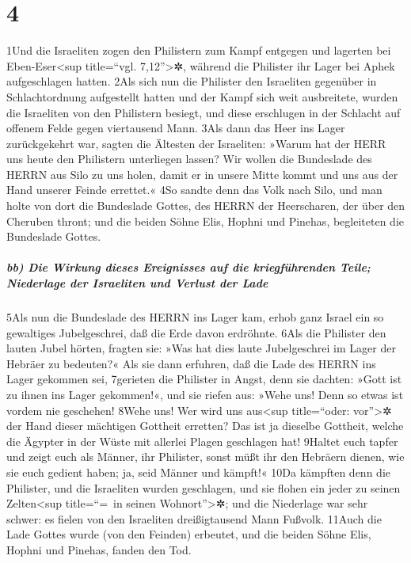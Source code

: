 \hypertarget{section-3}{%
\section{4}\label{section-3}}

1Und die Israeliten zogen den Philistern zum Kampf entgegen und lagerten
bei Eben-Eser\textless sup title=``vgl. 7,12''\textgreater✲, während die
Philister ihr Lager bei Aphek aufgeschlagen hatten. 2Als sich nun die
Philister den Israeliten gegenüber in Schlachtordnung aufgestellt hatten
und der Kampf sich weit ausbreitete, wurden die Israeliten von den
Philistern besiegt, und diese erschlugen in der Schlacht auf offenem
Felde gegen viertausend Mann. 3Als dann das Heer ins Lager zurückgekehrt
war, sagten die Ältesten der Israeliten: »Warum hat der HERR uns heute
den Philistern unterliegen lassen? Wir wollen die Bundeslade des HERRN
aus Silo zu uns holen, damit er in unsere Mitte kommt und uns aus der
Hand unserer Feinde errettet.« 4So sandte denn das Volk nach Silo, und
man holte von dort die Bundeslade Gottes, des HERRN der Heerscharen, der
über den Cheruben thront; und die beiden Söhne Elis, Hophni und Pinehas,
begleiteten die Bundeslade Gottes.

\hypertarget{bb-die-wirkung-dieses-ereignisses-auf-die-kriegfuxfchrenden-teile-niederlage-der-israeliten-und-verlust-der-lade}{%
\subparagraph{bb) Die Wirkung dieses Ereignisses auf die kriegführenden
Teile; Niederlage der Israeliten und Verlust der
Lade}\label{bb-die-wirkung-dieses-ereignisses-auf-die-kriegfuxfchrenden-teile-niederlage-der-israeliten-und-verlust-der-lade}}

5Als nun die Bundeslade des HERRN ins Lager kam, erhob ganz Israel ein
so gewaltiges Jubelgeschrei, daß die Erde davon erdröhnte. 6Als die
Philister den lauten Jubel hörten, fragten sie: »Was hat dies laute
Jubelgeschrei im Lager der Hebräer zu bedeuten?« Als sie dann erfuhren,
daß die Lade des HERRN ins Lager gekommen sei, 7gerieten die Philister
in Angst, denn sie dachten: »Gott ist zu ihnen ins Lager gekommen!«, und
sie riefen aus: »Wehe uns! Denn so etwas ist vordem nie geschehen! 8Wehe
uns! Wer wird uns aus\textless sup title=``oder: vor''\textgreater✲ der
Hand dieser mächtigen Gottheit erretten? Das ist ja dieselbe Gottheit,
welche die Ägypter in der Wüste mit allerlei Plagen geschlagen hat!
9Haltet euch tapfer und zeigt euch als Männer, ihr Philister, sonst müßt
ihr den Hebräern dienen, wie sie euch gedient haben; ja, seid Männer und
kämpft!« 10Da kämpften denn die Philister, und die Israeliten wurden
geschlagen, und sie flohen ein jeder zu seinen Zelten\textless sup
title=``=~in seinen Wohnort''\textgreater✲; und die Niederlage war sehr
schwer: es fielen von den Israeliten dreißigtausend Mann Fußvolk. 11Auch
die Lade Gottes wurde (von den Feinden) erbeutet, und die beiden Söhne
Elis, Hophni und Pinehas, fanden den Tod.

